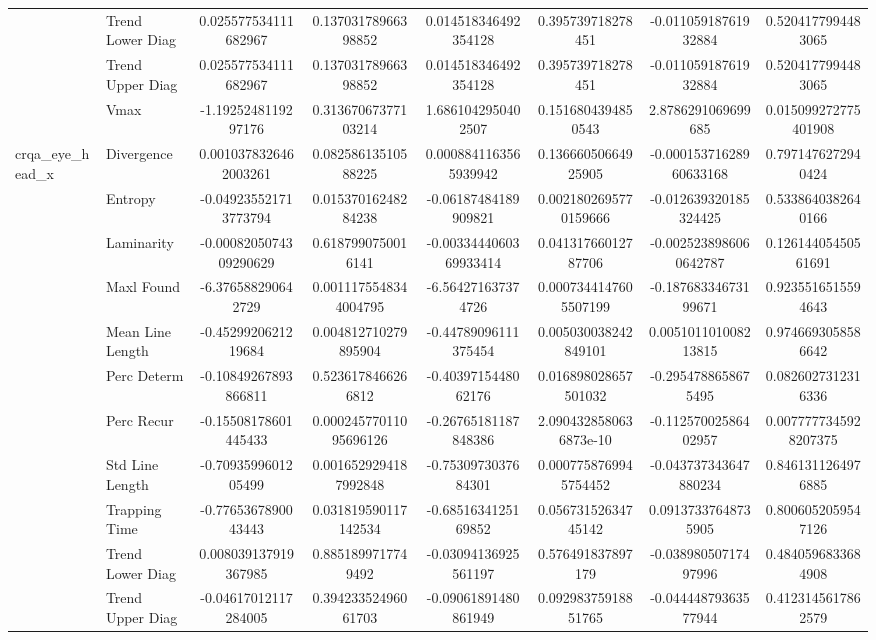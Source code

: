 \begin{tabular}{llcc|cc|cc}
 & Trend Lower Diag & 0.025577534111682967 & 0.13703178966398852 & 0.014518346492354128 & 0.395739718278451 & -0.01105918761932884 & 0.5204177994483065 \\
 & Trend Upper Diag & 0.025577534111682967 & 0.13703178966398852 & 0.014518346492354128 & 0.395739718278451 & -0.01105918761932884 & 0.5204177994483065 \\
 & Vmax & -1.1925248119297176 & 0.31367067377103214 & 1.6861042950402507 & 0.1516804394850543 & 2.8786291069699685 & 0.015099272775401908 \\
\midrule
\multirow{12}{*}{crqa_eye_head_x} & Divergence & 0.0010378326462003261 & 0.08258613510588225 & 0.0008841163565939942 & 0.13666050664925905 & -0.00015371628960633168 & 0.7971476272940424 \\
 & Entropy & -0.049235521713773794 & 0.01537016248284238 & -0.06187484189909821 & 0.0021802695770159666 & -0.012639320185324425 & 0.5338640382640166 \\
 & Laminarity & -0.0008205074309290629 & 0.6187990750016141 & -0.0033444060369933414 & 0.04131766012787706 & -0.0025238986060642787 & 0.12614405450561691 \\
 & Maxl Found & -6.376588290642729 & 0.0011175548344004795 & -6.564271637374726 & 0.0007344147605507199 & -0.18768334673199671 & 0.9235516515594643 \\
 & Mean Line Length & -0.4529920621219684 & 0.004812710279895904 & -0.44789096111375454 & 0.005030038242849101 & 0.005101101008213815 & 0.9746693058586642 \\
 & Perc Determ & -0.10849267893866811 & 0.5236178466266812 & -0.4039715448062176 & 0.016898028657501032 & -0.2954788658675495 & 0.0826027312316336 \\
 & Perc Recur & -0.15508178601445433 & 0.00024577011095696126 & -0.26765181187848386 & 2.0904328580636873e-10 & -0.11257002586402957 & 0.0077777345928207375 \\
 & Std Line Length & -0.7093599601205499 & 0.0016529294187992848 & -0.7530973037684301 & 0.0007758769945754452 & -0.043737343647880234 & 0.8461311264976885 \\
 & Trapping Time & -0.7765367890043443 & 0.031819590117142534 & -0.6851634125169852 & 0.05673152634745142 & 0.09137337648735905 & 0.8006052059547126 \\
 & Trend Lower Diag & 0.008039137919367985 & 0.8851899717749492 & -0.03094136925561197 & 0.576491837897179 & -0.03898050717497996 & 0.4840596833684908 \\
 & Trend Upper Diag & -0.04617012117284005 & 0.39423352496061703 & -0.09061891480861949 & 0.09298375918851765 & -0.04444879363577944 & 0.4123145617862579 \\

\end{tabular}
